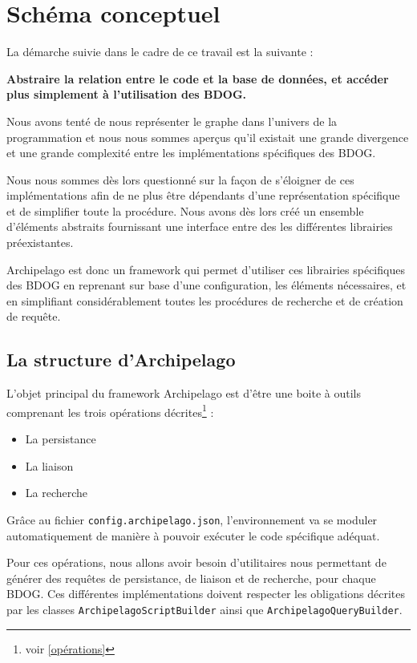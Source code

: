 \documentclass[a4paper,fleqn,12pt,oneside]{report}
\begin{document}

\newpage


\section{Schéma conceptuel}

La démarche suivie dans le cadre de ce travail est la suivante :

\begin{center}
\textbf{Abstraire la relation entre le code et la base de données, et accéder plus simplement à l’utilisation des BDOG. }
\end{center} 

Nous avons tenté de nous représenter le graphe dans l'univers de la programmation et nous nous sommes aperçus qu'il existait une grande divergence et une grande complexité entre les implémentations spécifiques des BDOG.

Nous nous sommes dès lors questionné sur la façon de s'éloigner de ces implémentations afin de ne plus être dépendants d'une représentation spécifique et de simplifier toute la procédure. Nous avons dès lors créé un ensemble d'éléments abstraits fournissant une interface entre des les différentes librairies préexistantes.

Archipelago est donc un framework qui permet d'utiliser ces librairies spécifiques des BDOG en reprenant sur base d’une configuration, les éléments nécessaires, et en simplifiant considérablement toutes les procédures de recherche et de création de requête.
\subsection{La structure d'Archipelago}

L'objet principal du framework Archipelago est d'être une boite à outils comprenant les trois opérations décrites\footnote{voir \ref{opérations}} :
\begin{itemize}
\item La persistance
\item La liaison
\item La recherche
\end{itemize}

Grâce au fichier \texttt{config.archipelago.json}, l'environnement va se moduler automatiquement de manière à pouvoir exécuter le code spécifique adéquat.

Pour ces opérations, nous allons avoir besoin d'utilitaires nous permettant de générer des requêtes de persistance, de liaison et de recherche, pour chaque BDOG. Ces différentes implémentations doivent respecter les obligations décrites par les classes \texttt{ArchipelagoScriptBuilder} ainsi que \texttt{ArchipelagoQueryBuilder}.
\end{document}
